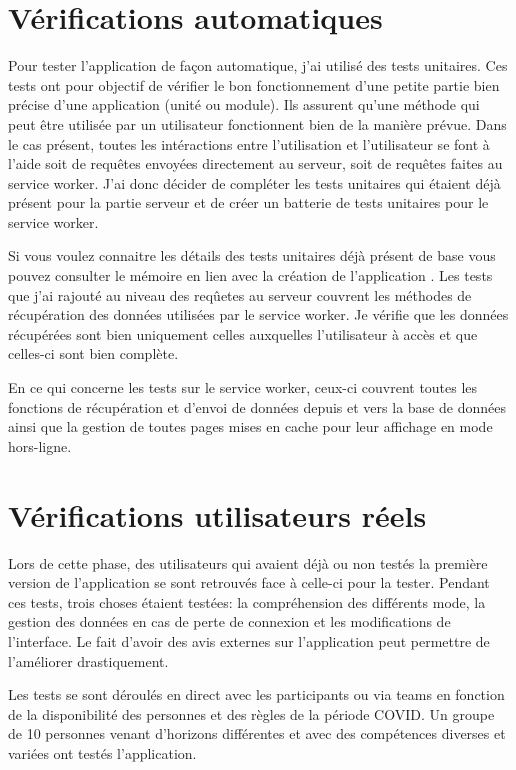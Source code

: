 \documentclass{EPL-master-thesis-covers-FR}
\begin{document}
		

		\section{Vérifications automatiques}
			Pour tester l'application de façon automatique, j'ai utilisé des tests unitaires. Ces tests ont pour objectif de vérifier le bon fonctionnement d'une petite partie bien précise d'une application (unité ou module). Ils assurent qu'une méthode qui peut être utilisée par un utilisateur fonctionnent bien de la manière prévue. Dans le cas présent, toutes les intéractions entre l'utilisation et l'utilisateur se font à l'aide soit de requêtes envoyées directement au serveur, soit de requêtes faites au service worker. J'ai donc décider de compléter les tests unitaires qui étaient déjà présent pour la partie serveur et de créer un batterie de tests unitaires pour le service worker.

			Si vous voulez connaitre les détails des tests unitaires déjà présent de base vous pouvez consulter le mémoire en lien avec la création de l'application \cite{ref:haitiwater}. Les tests que j'ai rajouté au niveau des reqûetes au serveur couvrent les méthodes de récupération des données utilisées par le service worker. Je vérifie que les données récupérées sont bien uniquement celles auxquelles l'utilisateur à accès et que celles-ci sont bien complète.
			
			En ce qui concerne les tests sur le service worker, ceux-ci couvrent toutes les fonctions de récupération et d'envoi de données depuis et vers la base de données ainsi que la gestion de toutes pages mises en cache pour leur affichage en mode hors-ligne.

		\section{Vérifications utilisateurs réels}
			Lors de cette phase, des utilisateurs qui avaient déjà ou non testés la première version de l'application se sont retrouvés face à celle-ci pour la tester. Pendant ces tests, trois choses étaient testées: la compréhension des différents mode, la gestion des données en cas de perte de connexion et les modifications de l'interface. Le fait d'avoir des avis externes sur l'application peut permettre de l'améliorer drastiquement.
			
			
			Les tests se sont déroulés en direct avec les participants ou via teams en fonction de la disponibilité des personnes et des règles de la période COVID. Un groupe de 10 personnes venant d'horizons différentes et avec des compétences diverses et variées ont testés l'application.
\end{document}
